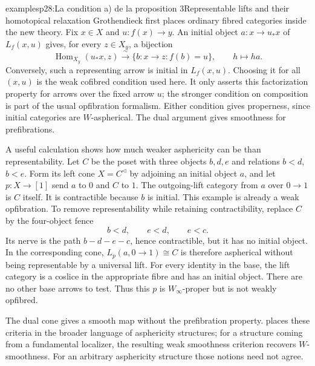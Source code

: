 \begin{dcomment}{examples}{p28:La condition a) de la proposition 3}{Representable lifts and their homotopical relaxation}
Grothendieck first places ordinary fibred categories inside the new theory. Fix $x\in X$ and $u:f(x)\to y$. An initial object $a:x\to u_*x$ of $L_f(x,u)$ gives, for every $z\in X_y$, a bijection
\[
 \operatorname{Hom}_{X_y}(u_*x,z)
 \xrightarrow{\ \sim\ }
 \{b:x\to z:f(b)=u\},\qquad h\longmapsto ha.
\]
Conversely, such a representing arrow is initial in $L_f(x,u)$. Choosing it for all $(x,u)$ is the weak cofibred condition used here. It only asserts this factorization property for arrows over the fixed arrow $u$; the stronger condition on composition is part of the usual opfibration formalism. Either condition gives properness, since initial categories are $W$-aspherical. The dual argument gives smoothness for prefibrations.

A useful calculation shows how much weaker asphericity can be than representability. Let $C$ be the poset with three objects $b,d,e$ and relations $b<d$, $b<e$. Form its left cone $X=C^{\lhd}$ by adjoining an initial object $a$, and let $p:X\to[1]$ send $a$ to $0$ and $C$ to $1$. The outgoing-lift category from $a$ over $0\to1$ is $C$ itself. It is contractible because $b$ is initial. This example is already a weak opfibration. To remove representability while retaining contractibility, replace $C$ by the four-object fence
\[
 b<d,\qquad e<d,\qquad e<c.
\]
Its nerve is the path $b-d-e-c$, hence contractible, but it has no initial object. In the corresponding cone, $L_p(a,0\to1)\cong C$ is therefore aspherical without being representable by a universal lift. For every identity in the base, the lift category is a coslice in the appropriate fibre and has an initial object. There are no other base arrows to test. Thus this $p$ is $W_\infty$-proper but is not weakly opfibred.

The dual cone gives a smooth map without the prefibration property. \citet[Proposition 4.3 and Example 4.17]{Maltsiniotis2005Asphericite} places these criteria in the broader language of asphericity structures; for a structure coming from a fundamental localizer, the resulting weak smoothness criterion recovers $W$-smoothness. For an arbitrary asphericity structure those notions need not agree.
\end{dcomment}

